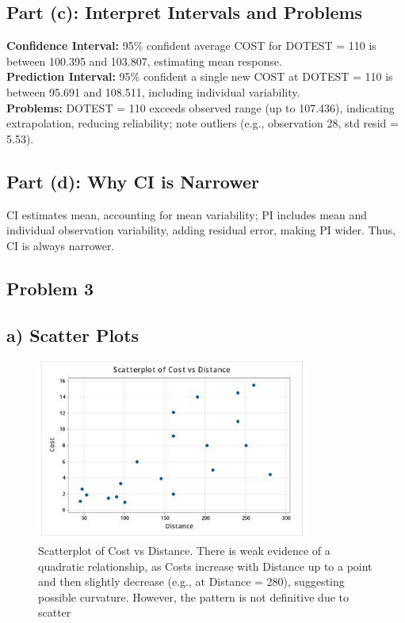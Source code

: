 \documentclass{article}
\begin{document}
\subsection*{Part (c): Interpret Intervals and Problems}
\textbf{Confidence Interval:} 95\% confident average COST for DOTEST = 110 is between 100.395 and 103.807, estimating mean response. \\
\textbf{Prediction Interval:} 95\% confident a single new COST at DOTEST = 110 is between 95.691 and 108.511, including individual variability. \\
\textbf{Problems:} DOTEST = 110 exceeds observed range (up to 107.436), indicating extrapolation, reducing reliability; note outliers (e.g., observation 28, std resid = 5.53).

\subsection*{Part (d): Why CI is Narrower}
CI estimates mean, accounting for mean variability; PI includes mean and individual observation variability, adding residual error, making PI wider. Thus, CI is always narrower.
\newpage

\subsection*{Problem 3}
\subsection*{a) Scatter Plots}

\begin{figure}[h] %
    \centering %
    \includegraphics[width=0.8\textwidth]{COST_vs_DISTANCE.jpeg} %
    \caption{Scatterplot of Cost vs Distance. There is weak evidence of a quadratic relationship, as Costs increase with Distance up to a point and then slightly decrease (e.g., at Distance = 280), suggesting possible curvature. However, the pattern is not definitive due to scatter} %
    \label{fig:scatterplot-cost-distance} %
\end{figure}
\newpage
\end{document}
